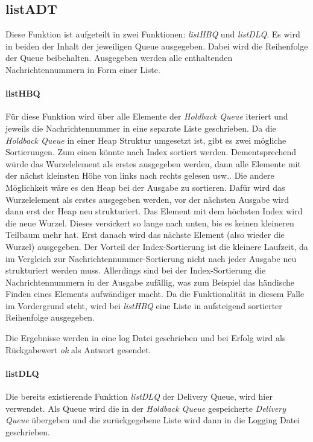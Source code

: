 \subsection{listADT}

Diese Funktion ist aufgeteilt in zwei Funktionen: \textit{listHBQ} und \textit{listDLQ}. 
Es wird in beiden der Inhalt der jeweiligen Queue ausgegeben. Dabei wird die Reihenfolge der Queue beibehalten. Ausgegeben werden alle enthaltenden Nachrichtennummern in Form einer Liste. 

\paragraph{listHBQ}
Für diese Funktion wird über alle Elemente der \textit{Holdback Queue} iteriert und jeweils die Nachrichtennummer in eine separate Liste geschrieben. 
Da die \textit{Holdback Queue} in einer Heap Struktur umgesetzt ist, gibt es zwei mögliche Sortierungen. Zum einen könnte nach Index sortiert werden. Dementsprechend würde das Wurzelelement als erstes ausgegeben werden, dann alle Elemente mit der nächst kleinsten Höhe von links nach rechts gelesen usw..
Die andere Möglichkeit wäre es den Heap bei der Ausgabe zu sortieren. Dafür wird das Wurzelelement als erstes ausgegeben werden, vor der nächsten Ausgabe wird dann erst der Heap neu strukturiert. Das Element mit dem höchsten Index wird die neue Wurzel. Dieses versickert so lange nach unten, bis es keinen kleineren Teilbaum mehr hat. Erst danach wird das nächste Element (also wieder die Wurzel) ausgegeben. 
Der Vorteil der Index-Sortierung ist die kleinere Laufzeit, da im Vergleich zur Nachrichtennummer-Sortierung nicht nach jeder Ausgabe neu strukturiert werden muss. Allerdings sind bei der Index-Sortierung die Nachrichtennummern in der Ausgabe zufällig, was zum Beispiel das händische Finden eines Elements aufwändiger macht. 
Da die Funktionalität in diesem Falle im Vordergrund steht, wird bei \textit{listHBQ} eine Liste in aufsteigend sortierter Reihenfolge ausgegeben. 

Die Ergebnisse werden in eine log Datei geschrieben und bei Erfolg wird als Rückgabewert \textit{ok} als Antwort gesendet.

\paragraph{listDLQ}
Die bereits existierende Funktion \textit{listDLQ} der Delivery Queue, wird hier verwendet. 
Als Queue wird die in der \textit{Holdback Queue} gespeicherte \textit{Delivery Queue} übergeben und die zurückgegebene Liste wird dann in die Logging Datei geschrieben. 

